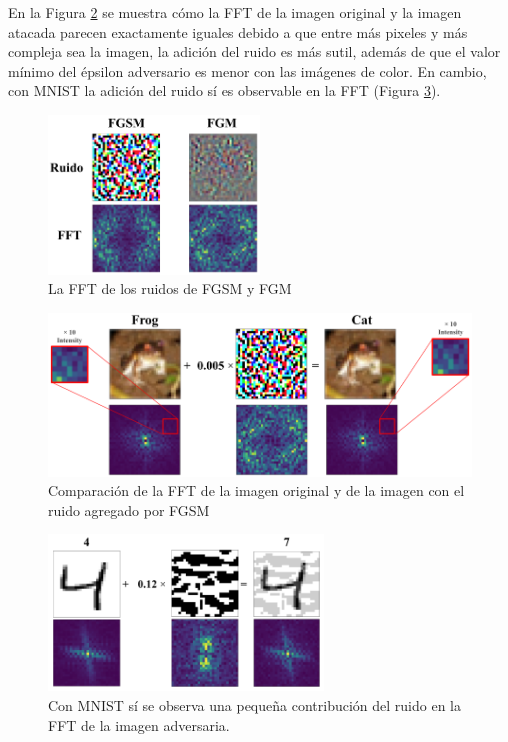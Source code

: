 En la Figura \ref{frog_cat_fft} se muestra cómo la FFT de la imagen original y la imagen atacada parecen exactamente iguales debido a que entre más pixeles y más compleja sea la imagen, la adición del ruido es más sutil, además de que el valor mínimo del épsilon adversario es menor con las imágenes de color. En cambio, con MNIST la adición del ruido sí es observable en la FFT (Figura \ref{fft_mnist}).

\begin{figure}[h!]
    \centering
    \includegraphics[width=0.5\textwidth]{images/cifar-10/frog_noises.png}
    \caption{La FFT de los ruidos de FGSM y FGM}
    \label{frog_ruidos}
\end{figure}

\begin{figure}[h!]
    \centering
    \includegraphics[width=\textwidth]{images/cifar-10/frog_cat_fgsm_fft.png}
    \caption{Comparación de la FFT de la imagen original y de la imagen con el ruido agregado por FGSM}
    \label{frog_cat_fft}
\end{figure}

\begin{figure}[h!]
    \centering
    \includegraphics[width=0.65\textwidth]{images/mnist/ffts.png}
    \caption{Con MNIST sí se observa una pequeña contribución del ruido en la FFT de la imagen adversaria.}
    \label{fft_mnist}
\end{figure}

